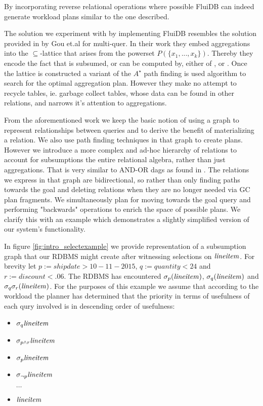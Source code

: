By incorporating reverse relational operations where possible FluiDB
can indeed generate workload plans similar to the one described.

The solution we experiment with by implementing FluiDB resembles the
solution provided in \cite{gouSupSearchEfficient2006} by Gou et.al for
multi-quer. In their work they embed aggregations  into the \(\subseteq\)-lattice that arises from the powerset
\(P(\{x_1, ..., x_k\})\). Thereby they encode the fact that  is subsumed, or can be computed by, either of ,  or . Once the
lattice is constructed a variant of the \(A^{\star}\) path finding is
used algorithm to search for the optimal aggregation plan. However
they make no attempt to recycle tables, ie. garbage collect tables,
whose data can be found in other relations, and narrows it's attention
to aggregations.

From the aforementioned work we keep the basic notion of using a graph
to represent relationships between queries and to derive the benefit
of materializing a relation. We also use path finding techniques in
that graph to create plans. However we introduce a more complex and
ad-hoc hierarchy of relations to account for subsumptions the entire
relational algebra, rather than just aggregations. That is very
similar to AND-OR dags as found in
\cite{mistryMaterializedViewSelection2001}.  The relations we express
in that graph are bidirectional, so rather than only finding paths
towards the goal and deleting relations when they are no longer needed
via GC plan fragments. We simultaneously plan for moving towards the
goal query and performing "backwards" operations to enrich the space
of possible plans. We clarify this with an example which demonstrates
a slightly simplified version of our system's functionality.

In figure \ref{fig:intro_selectexample} we provide representation of a
subsumption graph that our RDBMS might create after witnessing
selections on \(\mathit{lineitem}\). For brevity let \(p:=shipdate > 10-11-2015\),
\(q:=quantity < 24\) and \(r:=discount < .06\). The RDBMS has
encountered \(\sigma_{p}(\mathit{lineitem})\), \(\sigma_{q}(\mathit{lineitem})\) and
\(\sigma_{q} \sigma_{r} (\mathit{lineitem})\). For the purposes of this example we
assume that according to the workload the planner has determined that
the priority in terms of usefulness of each qury involved is in
descending order of usefulness:

\begin{itemize}
\item \(\sigma_q \mathit{lineitem}\)
\item \(\sigma_{p \land r} \mathit{lineitem}\)
\item \(\sigma_p \mathit{lineitem}\)
\item \(\sigma_{\neg p} \mathit{lineitem}\)
\item[ \( \ldots \)]
\item \(\mathit{lineitem}\)
\end{itemize}


